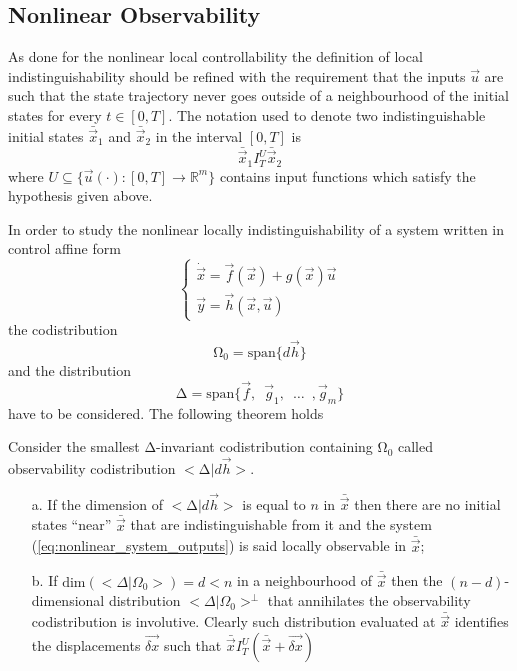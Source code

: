 \subsection{Nonlinear Observability}
As done for the nonlinear local controllability the definition of local
indistinguishability should be refined with the requirement that
the inputs $\vec{u}$ are such that the state trajectory never goes outside of
a neighbourhood of the initial states for every $t \in [0, T]$.
The notation used to denote two indistinguishable initial states $\bar{\vec{x}}_1$
and $\bar{\vec{x}}_2$ in the interval $[0,T]$ is
\[
\bar{\vec{x}}_1 I^{U}_{T} \bar{\vec{x}}_2
\]
where $U \subseteq \{\vec{u}(\cdot):[0,T] \rightarrow \mathbb{R}^{m}\}$ contains
input functions which satisfy the hypothesis given above.
\par
In order to study the nonlinear locally indistinguishability of a system written in control affine form
\begin{equation}\label{eq:nonlinear_system_outputs}
  \begin{cases}
    \dot{\vec{x}} = \vec{f}(\vec{x}) + g(\vec{x}) \vec{u}\\
    \vec{y} = \vec{h}(\vec{x}, \vec{u})
  \end{cases}
\end{equation}
the codistribution
\[
\mathrm{\Omega}_0 = \mathrm{span} \{ d \vec{h}\}
\]
and the distribution
\[
\mathrm{\Delta}= \mathrm{span} \{\vec{f},\enspace\vec{g}_1, \enspace \hdots \enspace, \vec{g}_m\}
\]
have to be considered. The following theorem holds
\begin{theorem}\label{th:obs}
  Consider the smallest $\mathrm{\Delta}$-invariant codistribution containing $\mathrm{\Omega}_0$ called
  observability codistribution $< \mathrm{\Delta} | d\vec{h} >$.
  \begin{itemize}
  \item[a.]If the dimension of $< \mathrm{\Delta}|d\vec{h} >$ is equal to $n$ in $\bar{\vec{x}}$ then
    there are no initial states ``near'' $\bar{\vec{x}}$ that are indistinguishable from
    it and the system (\ref{eq:nonlinear_system_outputs}) is said locally observable in $\bar{\vec{x}}$;
  \item[b.]If $\text{dim}(< \Delta|\Omega_0 >) = d < n$ in a neighbourhood of $\bar{\vec{x}}$ then
    the $(n-d)$-dimensional distribution $< \Delta|\Omega_0 >^{\perp}$ that annihilates
    the observability codistribution is involutive. Clearly such distribution evaluated at $\bar{\vec{x}}$
    identifies the displacements $\vec{\delta{x}}$ such that $\bar{\vec{x}} I^{U}_{T}(\bar{\vec{x}} + \vec{\delta x})$
  \end{itemize}
\end{theorem}
